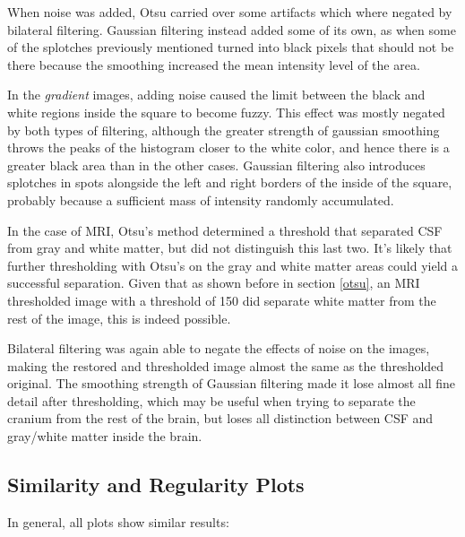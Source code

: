 When noise was added, Otsu carried over some artifacts which where negated by bilateral filtering. Gaussian filtering instead added some of its own, as when some of the splotches previously mentioned turned into black pixels that should not be there because the smoothing increased the mean intensity level of the area. 

In the \textit{gradient} images, adding noise caused the limit between the black and white regions inside the square to become fuzzy. This effect was mostly negated by both types of filtering, although the greater strength of gaussian smoothing throws the peaks of the histogram closer to the white color, and hence there is a greater black area than in the other cases. Gaussian filtering also introduces splotches in spots alongside the left and right borders of the inside of the square, probably because a sufficient mass of intensity randomly accumulated.

In the case of MRI, Otsu's method determined a threshold that separated CSF from gray and white matter, but did not distinguish this last two. It's likely that further thresholding with Otsu's on the gray and white matter areas could yield a successful separation. Given that as shown before in section \ref{otsu}, an MRI thresholded image with a threshold of 150 did separate white matter from the rest of the image, this is indeed possible.

Bilateral filtering was again able to negate the effects of noise on the images, making the restored and thresholded image almost the same as the thresholded original. The smoothing strength of Gaussian filtering made it lose almost all fine detail after thresholding, which may be useful when trying to separate the cranium from the rest of the brain, but loses all distinction between CSF and gray/white matter inside the brain.


\subsection{Similarity and Regularity Plots}

In general, all plots show similar results:

